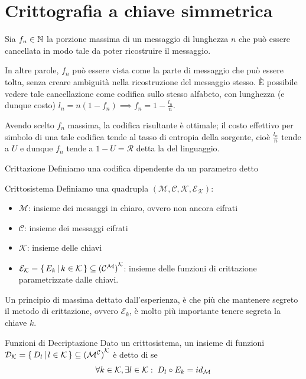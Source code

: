 \section{Crittografia a chiave simmetrica}

Sia \(f_n\in\mathbb{N}\) la porzione massima di un messaggio di lunghezza \(n\) che può essere cancellata in modo tale da poter ricostruire il messaggio.

In altre parole, \(f_n\) può essere vista come la parte di messaggio che può essere tolta, senza creare ambiguità nella ricostruzione del messaggio stesso.
È possibile vedere tale cancellazione come codifica sullo stesso alfabeto, con lunghezza (e dunque costo) \(l_n = n(1-f_n) \implies f_n = 1-\frac{l_n}{n}\).

Avendo scelto \(f_n\) massima, la codifica risultante è ottimale;
il costo effettivo per simbolo di una tale codifica tende al tasso di entropia della sorgente, cioè \(\frac{l_n}{n}\) tende a \(U\) e dunque \(f_n\) tende a \(1-U = \mathcal{R}\) detta la  del linguaggio.

\begin{definition}{Crittazione}
  Definiamo  una codifica dipendente da un parametro detto 
\end{definition}

\begin{definition}{Crittosistema}
  Definiamo  una quadrupla \((\mathcal{M}, \mathcal{C}, \mathcal{K}, \mathcal{E}_\mathcal{K})\):
  \begin{itemize}
    \item \(\mathcal{M}\): insieme dei messaggi in chiaro, ovvero non ancora cifrati
    \item \(\mathcal{C}\): insieme dei messaggi cifrati
    \item \(\mathcal{K}\): insieme delle chiavi
    \item \(\mathcal{E}_{\mathcal{K}} = \set{E_k}[k\in\mathcal{K}] \subseteq {(\mathcal{C}^{\mathcal{M}})}^{\mathcal{K}}\): insieme delle funzioni di crittazione parametrizzate dalle chiavi.
  \end{itemize}
\end{definition}

Un principio di massima dettato dall'esperienza, è che più che mantenere segreto il metodo di crittazione, ovvero \(\mathcal{E}_k\), è molto più importante tenere segreta la chiave \(k\).

\begin{definition}{Funzioni di Decriptazione}
  Dato un crittosistema, un insieme di funzioni \(\mathcal{D}_{\mathcal{K}} = \set{D_l}[l\in\mathcal{K}]\subseteq {(\mathcal{M}^{\mathcal{C}})}^{\mathcal{K}}\) è detto di  se
  \[\forall k \in \mathcal{K}, \exists l \in \mathcal{K}:\; D_l \circ E_k = id_{\mathcal{M}}\]
\end{definition}

